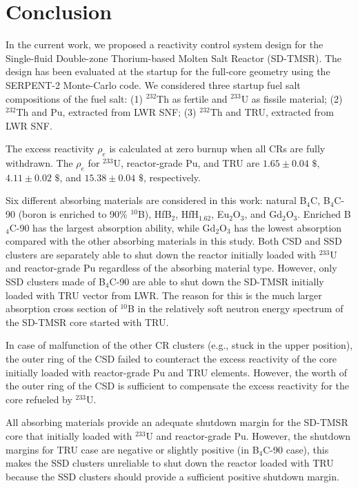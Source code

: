 \section{Conclusion} \label{Conclusion}
In the current work, we proposed a reactivity control system design for the 
Single-fluid Double-zone Thorium-based Molten Salt Reactor (SD-TMSR). The 
design has been evaluated at the startup for the full-core geometry using the
SERPENT-2 Monte-Carlo code. We considered three startup fuel salt compositions of 
the fuel salt: (1) $^{232}$Th as fertile and $^{233}$U as fissile material; 
(2) $^{232}$Th and Pu, extracted from \gls{LWR} \gls{SNF}; (3) 
$^{232}$Th and TRU, extracted from \gls{LWR} \gls{SNF}.

The excess reactivity $\rho_e$ is calculated at zero burnup when all CRs are 
fully withdrawn. The $\rho_e$ for $^{233}$U, reactor-grade Pu, and 
TRU are $1.65\pm0.04$ $\$$, $4.11\pm0.02$ $\$$, and $15.38\pm0.04$ $\$$, 
respectively.

Six different absorbing materials are considered in this work:
natural B$_4$C, B$_4$C-90 (boron is enriched to 90\% $^{10}$B), HfB$_2$, 
HfH$_{1.62}$, Eu$_2$O$_3$, and Gd$_2$O$_3$. Enriched B$_4$C-90 has the largest 
absorption ability, while Gd$_2$O$_3$ has the lowest absorption compared with 
the other absorbing materials in this study. Both CSD and SSD clusters are 
separately able to shut down the reactor initially loaded with $^{233}$U and 
reactor-grade Pu regardless of the absorbing material type. However, only SSD 
clusters made of B$_4$C-90 are able to shut down the SD-TMSR initially loaded 
with TRU vector from \gls{LWR}. The reason for this is the much larger 
absorption cross section of $^{10}$B in the relatively soft neutron energy 
spectrum of the SD-TMSR core started with TRU.

In case of malfunction of the other CR clusters (e.g., stuck in the upper 
position), the outer ring of the CSD failed to counteract the excess 
reactivity of the core initially loaded with reactor-grade Pu and TRU elements.
However, the worth of the outer ring of the CSD is sufficient 
to compensate the excess reactivity for the core refueled by $^{233}$U.

All absorbing materials provide an adequate shutdown margin for the SD-TMSR 
core that initially loaded with $^{233}$U and reactor-grade Pu. However, the 
shutdown margins for TRU case are negative or slightly positive (in B$_4$C-90 
case), this makes the SSD clusters unreliable to shut down the reactor loaded 
with TRU because the SSD clusters should provide a sufficient positive shutdown margin.

